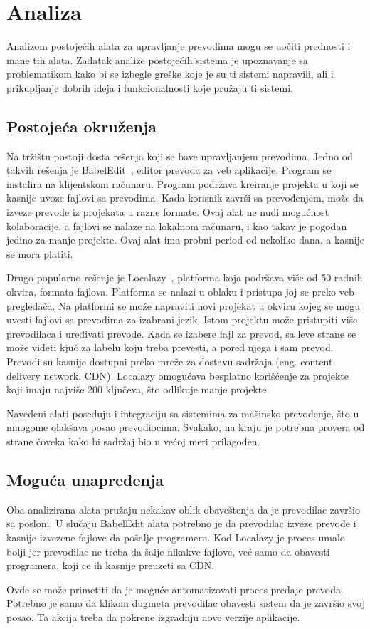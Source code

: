 \chapter{Analiza}\label{ch:analiza}

Analizom postojećih alata za upravljanje prevodima mogu se uočiti prednosti i mane tih alata. 
Zadatak analize postojećih sistema je upoznavanje sa problematikom kako bi se izbegle greške
koje je su ti sistemi napravili, ali i prikupljanje dobrih ideja i funkcionalnosti koje pružaju ti sistemi.


\section{Postojeća okruženja}\label{sec:analiza-postojeca_okruzenja}

Na tržištu postoji dosta rešenja koji se bave upravljanjem prevodima. Jedno od takvih rešenja je 
BabelEdit~\cite{BabelEdit}, editor prevoda za veb aplikacije. Program se instalira na klijentskom računaru.
Program podržava kreiranje projekta u koji se kasnije uvoze fajlovi sa prevodima. Kada korisnik završi 
sa prevođenjem, može da izveze prevode iz projekata u razne formate. Ovaj alat ne nudi mogućnost kolaboracije,
a fajlovi se nalaze na lokalnom računaru, i kao takav je pogodan jedino za manje projekte. Ovaj alat ima 
probni period od nekoliko dana, a kasnije se mora platiti.

Drugo popularno rešenje je Localazy~\cite{Localazy}, platforma koja podržava više od 50 radnih okvira, 
formata fajlova. Platforma se nalazi u oblaku i pristupa joj se preko veb pregledača. Na platformi se može 
napraviti novi projekat u okviru kojeg se mogu uvesti fajlovi sa prevodima za izabrani jezik. Istom projektu 
može pristupiti više prevodilaca i uređivati prevode. Kada se izabere fajl za prevod, sa leve strane se može 
videti kjuč za labelu koju treba prevesti, a pored njega i sam prevod. Prevodi su kasnije dostupni preko 
mreže za dostavu sadržaja (eng. content delivery network, CDN). Localazy omogućava besplatno korišćenje za 
projekte koji imaju najviše 200 ključeva, što odlikuje manje projekte.

Navedeni alati poseduju i integraciju sa sistemima za mašinsko prevođenje, što u mnogome olakšava posao 
prevodiocima. Svakako, na kraju je potrebna provera od strane čoveka kako bi sadržaj bio u većoj meri prilagođen. 


\section{Moguća unapređenja}\label{sec:analiza-moguca_unapredjenja}

Oba analizirana alata pružaju nekakav oblik obaveštenja da je prevodilac završio sa poslom. U slučaju BabelEdit
alata potrebno je da prevodilac izveze prevode i kasnije izvezene fajlove da pošalje programeru. Kod Localazy 
je proces umalo bolji jer prevodilac ne treba da šalje nikakve fajlove, već samo da obavesti programera, 
koji ce ih kasnije preuzeti sa CDN.

Ovde se može primetiti da je moguće automatizovati proces predaje prevoda. Potrebno je samo da klikom dugmeta
prevodilac obavesti sistem da je završio svoj posao. Ta akcija treba da pokrene izgradnju nove verzije aplikacije.